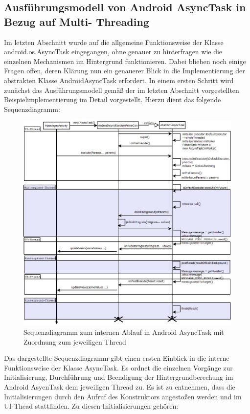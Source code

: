 \documentclass[12pt,oneside,a4paper,bibtotoc,liststotoc]{scrreprt}
\begin{document}
\subsection{Ausführungsmodell von Android AsyncTask in Bezug auf Multi- Threading}
Im letzten Abschnitt wurde auf die allgemeine Funktionsweise der Klasse android.os.AsyncTask eingegangen, ohne genauer zu hinterfragen wie die einzelnen Mechanismen im Hintergrund funktionieren. Dabei blieben noch einige Fragen offen, deren Klärung nun ein genauerer Blick in die Implementierung der abstrakten Klasse AndroidAsyncTask erfordert. In einem ersten Schritt wird zunächst das Ausführungsmodell gemäß der im letzten Abschnitt vorgestellten Beispielimplementierung im Detail vorgestellt. Hierzu dient das folgende Sequenzdiagramm:
\begin{figure}[H]
  \begin{centering}
    \includegraphics[height=1\textwidth]{img/asyncTask_seqenzdiagramm.png}
    \caption{Sequenzdiagramm zum internen Ablauf in Android AsyncTask mit Zuordnung zum jeweiligen Thread}
    \label{asyncTask_seqenzdiagramm}
  \end{centering}
\end{figure}
Das dargestellte Sequenzdiagramm gibt einen ersten Einblick in die interne Funktionsweise der Klasse AsyncTask. Es ordnet die einzelnen Vorgänge zur Initialisierung, Durchführung und Beendigung der Hintergrundberechung im Android AsycnTask dem jeweiligen Thread zu. Es ist zu entnehmen, dass die Initialisierungen durch den Aufruf des Konstruktors angestoßen werden und im UI-Thead stattfinden. Zu diesen Initialisierungen gehören:\newline
\end{document}
